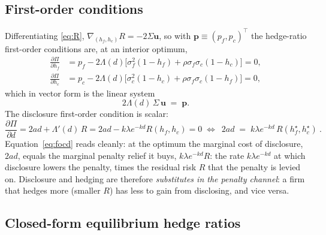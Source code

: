\documentclass[11pt,a4paper]{article}
\begin{document}
\subsection{First-order conditions}
\label{sec:foc}

Differentiating \eqref{eq:R}, $\nabla_{(h_f,h_c)}R=-2\Sigma\mathbf{u}$, so with $\mathbf{p}\equiv(p_f,p_c)^\top$ the hedge-ratio first-order conditions are, at an interior optimum,
\begin{align}
\frac{\partial\Pi}{\partial h_f}&=p_f-2\Lambda(d)\big[\sigma_f^2(1-h_f)+\rho\sigma_f\sigma_c(1-h_c)\big]=0,\label{eq:fochf}\\[2pt]
\frac{\partial\Pi}{\partial h_c}&=p_c-2\Lambda(d)\big[\sigma_c^2(1-h_c)+\rho\sigma_f\sigma_c(1-h_f)\big]=0,\label{eq:fochc}
\end{align}
which in vector form is the linear system
\begin{equation}
2\Lambda(d)\,\Sigma\,\mathbf{u}\;=\;\mathbf{p}.
\label{eq:linsys}
\end{equation}
The disclosure first-order condition is scalar:
\begin{equation}
\frac{\partial\Pi}{\partial d}=2ad+\Lambda'(d)\,R=2ad-k\lambda e^{-kd}R(h_f,h_c)=0
\;\Longleftrightarrow\;
\boxed{\ 2ad\;=\;k\lambda e^{-kd}\,R(h_f^\star,h_c^\star)\ }.
\label{eq:focd}
\end{equation}
Equation~\eqref{eq:focd} reads cleanly: at the optimum the marginal cost of disclosure, $2ad$, equals the marginal penalty relief it buys, $k\lambda e^{-kd}R$: the rate $k\lambda e^{-kd}$ at which disclosure lowers the penalty, times the residual risk $R$ that the penalty is levied on. Disclosure and hedging are therefore \emph{substitutes in the penalty channel}: a firm that hedges more (smaller $R$) has less to gain from disclosing, and vice versa.

\subsection{Closed-form equilibrium hedge ratios}
\label{sec:hedgesol}
\end{document}
